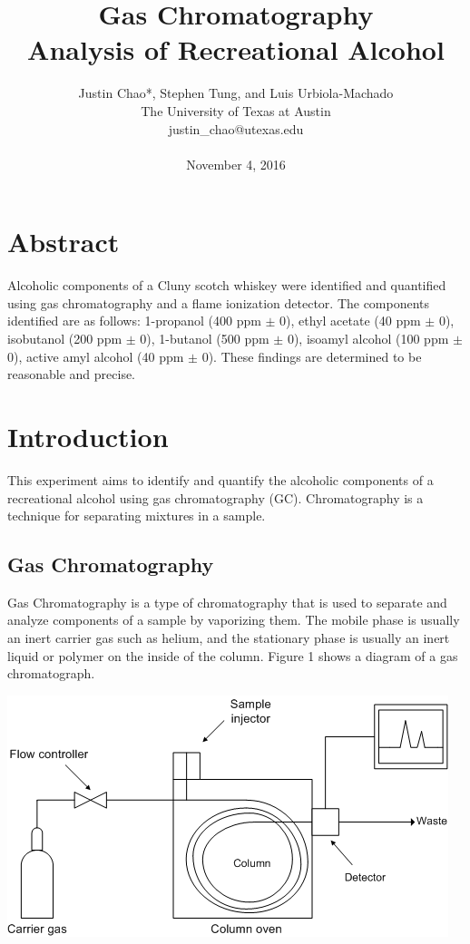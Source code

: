 \documentclass{article}
\title{Gas Chromatography \\Analysis of Recreational Alcohol}
\author{{Justin Chao*, Stephen Tung, and Luis Urbiola-Machado}\\[2ex]
The University of Texas at Austin \\ 
justin\_chao@utexas.edu \\ \\
November 4, 2016}
\date{}
\begin{document}
\maketitle
\unskip\vspace{1.5\baselineskip}


\begin{multicols}{2}

{\fontsize{9.5}{12}\selectfont   

\section*{Abstract}
Alcoholic components of a Cluny scotch whiskey were identified and
quantified using gas chromatography and a flame ionization detector.  The
components identified are as follows: 1-propanol (400 ppm $\pm$
0), ethyl acetate (40 ppm $\pm$ 0), isobutanol
(200 ppm $\pm$ 0), 1-butanol (500 ppm $\pm$ 0), isoamyl
alcohol (100 ppm $\pm$ 0), active amyl alcohol
(40 ppm $\pm$ 0). These findings are determined to be reasonable and
precise.

\section*{Introduction}
This experiment aims to identify and quantify the alcoholic components of a recreational
alcohol using gas chromatography (GC). Chromatography is a technique for
    separating mixtures in a sample. \cite{lab_man}

\subsection*{Gas Chromatography}
Gas Chromatography is a type of chromatography that is used to separate and
    analyze components of a sample by vaporizing them. The mobile phase is
    usually an inert carrier gas such as helium, and the stationary phase is
    usually an inert liquid or polymer on the inside of the column.
    Figure 1 shows a diagram of a gas chromatograph.
    \begin{center}
        \includegraphics[scale=0.35]{gc.png}
    \end{center}

}
\end{multicols}
\end{document}
